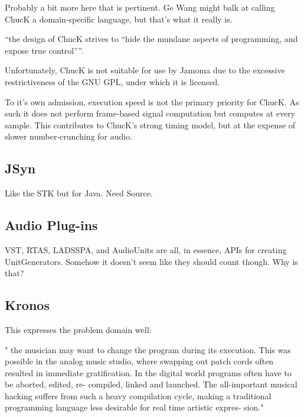 \documentclass[twoside,10pt]{article}
\begin{document}
Probably a bit more here that is pertinent.  Ge Wang might balk at calling ChucK a domain-specific language, but that's what it really is.

``the design of ChucK strives to “hide the mundane aspects of programming, and expose true control”''\cite{wang:2008}.

Unfortunately, ChucK is not suitable for use by Jamoma due to the excessive restrictiveness of the GNU GPL, under which it is licensed.

To it's own admission, execution speed is not the primary priority for ChucK.  As such it does not perform frame-based signal computation but computes at every sample.  This contributes to ChucK's strong timing model, but at the expense of slower number-crunching for audio.




\subsection{JSyn} %

Like the STK but for Java.  Need Source.


\subsection{Audio Plug-ins} %

VST, RTAS, LADSSPA, and AudioUnits are all, in essence, APIs for creating UnitGenerators.  Somehow it doesn't seem like they should count though.  Why is that?


\subsection{Kronos} %

This expresses the problem domain well:

" the musician may want to change the program during its execution. This was possible in the analog music studio, where swapping out patch cords often resulted in immediate gratification. In the digital world programs often have to be aborted, edited, re- compiled, linked and launched. The all-important musical hacking suffers from such a heavy compilation cycle, making a traditional programming language less desirable for real time artistic expres- sion." \cite{Norilo:2009}
\end{document}
